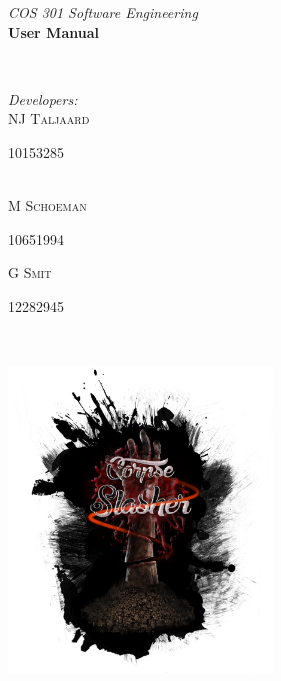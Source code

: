 \documentclass[letterpaper]{article}
\makeatletter
\def\printauthor{%
    {\large \@author}}
\makeatother
\begin{document}
\begin{titlepage}
\begin{center}
\begin{minipage}{0.4\textwidth}
\begin{flushleft} \large
\emph{COS 301 Software Engineering}\\
\vspace{1cm} \textbf{User Manual}
\end{flushleft}
\end{minipage}
~
\begin{minipage}{0.4\textwidth}
	\begin{flushright} \large
	\emph{Developers:} \\
		NJ \textsc{Taljaard} \\
			\begin{small}
				10153285
			\end{small} \\
		M  \textsc{Schoeman} \\
			\begin{small}
				10651994 \\
			\end{small}
		G  \textsc{Smit} \\
			\begin{small}
				12282945
			\end{small}
	\end{flushright}
\end{minipage}\\



\includegraphics[width=70mm, height=90mm]{corpseslasher.png}\\ %
 

\end{center}
\end{titlepage}
\end{document}

